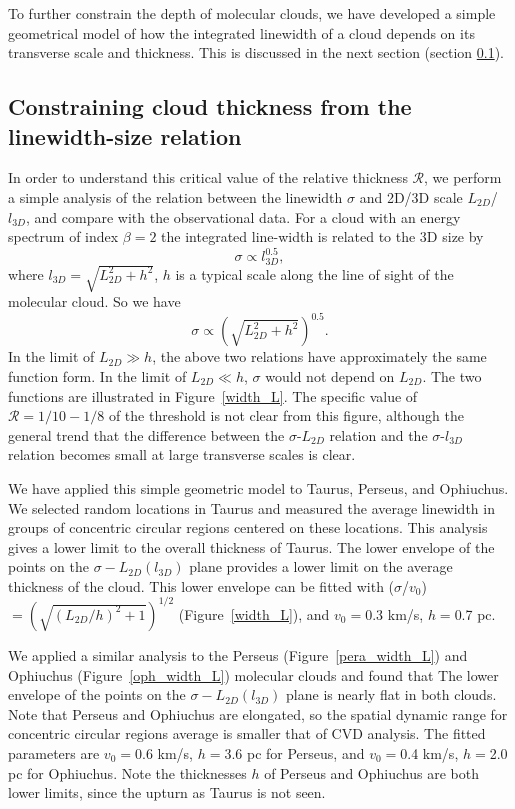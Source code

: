 \documentclass[iop,revtex4]{emulateapj}
\begin{document}
To further constrain the depth of molecular clouds, we have developed a simple geometrical model of how the integrated linewidth of a cloud depends on its transverse scale and thickness. This is discussed in the next section (section \ref{sec:size_linewidth}).


\subsection{Constraining cloud thickness from the linewidth-size relation}
\label{sec:size_linewidth}

In order to understand this critical value of the relative thickness $\mathcal{R}$, we perform a simple analysis of the relation between the linewidth $\sigma$ and 2D/3D scale $L_{2D}$/$l_{3D}$, and compare with the observational data. For a cloud with an energy spectrum of index $\beta=2$ the integrated line-width is related to the 3D size by
\begin{equation}
\sigma\propto l_{3D}^{0.5},
\label{CVD_3D}
\end{equation}
where $l_{3D}=\sqrt{L_{2D}^2+h^2}$, $h$ is a typical scale along the line of sight of the molecular cloud. So we have
\begin{equation}
\sigma\propto \left(\sqrt{L_{2D}^2+h^2}\right)^{0.5}.
\label{CVD_2D}
\end{equation}
In the limit of $L_{2D}\gg h$, the above two relations have approximately the same function form. In the limit of $L_{2D}\ll h$, $\sigma$ would not depend on $L_{2D}$. The two functions are illustrated in Figure~\ref{width_L}. The specific value of $\mathcal{R}=1/10-1/8$ of the threshold is not clear from this figure, although the general trend that the difference between the $\sigma$-$L_{2D}$ relation and the $\sigma$-$l_{3D}$ relation becomes small at large transverse scales is clear.


We have applied this simple geometric model to Taurus, Perseus, and Ophiuchus. We selected random locations in Taurus and measured the average linewidth in groups of concentric circular regions centered on these locations. This analysis gives a lower limit to the overall thickness of Taurus. The lower envelope of the points on the $\sigma-L_{2D}(l_{3D})$ plane provides a lower limit on the average thickness of the cloud. This lower envelope can be fitted with ($\sigma$/$v_0$)$=\left(\sqrt{(L_{2D}/h)^2+1}\right)^{1/2}$ (Figure~\ref{width_L}), and $v_0=$0.3 km/s, $h=$0.7 pc.


We applied a similar analysis to the Perseus (Figure~\ref{pera_width_L}) and Ophiuchus (Figure~\ref{oph_width_L}) molecular clouds and found that The lower envelope of the points on the $\sigma-L_{2D}(l_{3D})$ plane is nearly flat in both clouds. Note that Perseus and Ophiuchus are elongated, so the spatial dynamic range for concentric circular regions average is smaller that of CVD analysis. The fitted parameters are $v_0=$0.6 km/s, $h=$3.6 pc for Perseus, and $v_0=$0.4 km/s, $h=$2.0 pc for Ophiuchus. Note the thicknesses $h$ of Perseus and Ophiuchus are both lower limits, since the upturn as Taurus is not seen.
\end{document}
